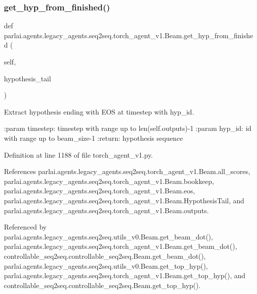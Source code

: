 \subsubsection{\texorpdfstring{get\+\_\+hyp\+\_\+from\+\_\+finished()}{get\_hyp\_from\_finished()}}
{\footnotesize\ttfamily def parlai.\+agents.\+legacy\+\_\+agents.\+seq2seq.\+torch\+\_\+agent\+\_\+v1.\+Beam.\+get\+\_\+hyp\+\_\+from\+\_\+finished (\begin{DoxyParamCaption}\item[{}]{self,  }\item[{}]{hypothesis\+\_\+tail }\end{DoxyParamCaption})}

\begin{DoxyVerb}Extract hypothesis ending with EOS at timestep with hyp_id.

:param timestep: timestep with range up to len(self.outputs)-1
:param hyp_id: id with range up to beam_size-1
:return: hypothesis sequence
\end{DoxyVerb}
 

Definition at line 1188 of file torch\+\_\+agent\+\_\+v1.\+py.



References parlai.\+agents.\+legacy\+\_\+agents.\+seq2seq.\+torch\+\_\+agent\+\_\+v1.\+Beam.\+all\+\_\+scores, parlai.\+agents.\+legacy\+\_\+agents.\+seq2seq.\+torch\+\_\+agent\+\_\+v1.\+Beam.\+bookkeep, parlai.\+agents.\+legacy\+\_\+agents.\+seq2seq.\+torch\+\_\+agent\+\_\+v1.\+Beam.\+eos, parlai.\+agents.\+legacy\+\_\+agents.\+seq2seq.\+torch\+\_\+agent\+\_\+v1.\+Beam.\+Hypothesis\+Tail, and parlai.\+agents.\+legacy\+\_\+agents.\+seq2seq.\+torch\+\_\+agent\+\_\+v1.\+Beam.\+outputs.



Referenced by parlai.\+agents.\+legacy\+\_\+agents.\+seq2seq.\+utils\+\_\+v0.\+Beam.\+get\+\_\+beam\+\_\+dot(), parlai.\+agents.\+legacy\+\_\+agents.\+seq2seq.\+torch\+\_\+agent\+\_\+v1.\+Beam.\+get\+\_\+beam\+\_\+dot(), controllable\+\_\+seq2seq.\+controllable\+\_\+seq2seq.\+Beam.\+get\+\_\+beam\+\_\+dot(), parlai.\+agents.\+legacy\+\_\+agents.\+seq2seq.\+utils\+\_\+v0.\+Beam.\+get\+\_\+top\+\_\+hyp(), parlai.\+agents.\+legacy\+\_\+agents.\+seq2seq.\+torch\+\_\+agent\+\_\+v1.\+Beam.\+get\+\_\+top\+\_\+hyp(), and controllable\+\_\+seq2seq.\+controllable\+\_\+seq2seq.\+Beam.\+get\+\_\+top\+\_\+hyp().

